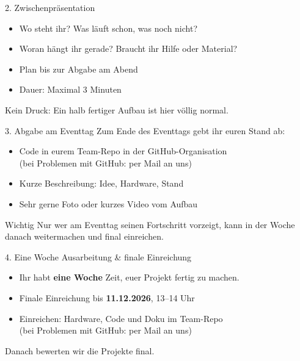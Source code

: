 \documentclass[10pt]{beamer}
\begin{document}
\begin{frame}{2. Zwischenpräsentation}
  \begin{itemize}
    \item Wo steht ihr? Was läuft schon, was noch nicht?
    \item Woran hängt ihr gerade? Braucht ihr Hilfe oder Material?
    \item Plan bis zur Abgabe am Abend
    \item Dauer: Maximal 3 Minuten
  \end{itemize}
  \vspace{0.5em}
  Kein Druck: Ein halb fertiger Aufbau ist hier völlig normal.
\end{frame}

\begin{frame}{3. Abgabe am Eventtag}
  Zum Ende des Eventtags gebt ihr euren Stand ab:
  \begin{itemize}
    \item Code in eurem Team-Repo in der GitHub-Organisation\\
          {\small(bei Problemen mit GitHub: per Mail an uns)}
    \item Kurze Beschreibung: Idee, Hardware, Stand
    \item Sehr gerne Foto oder kurzes Video vom Aufbau
  \end{itemize}
  \vspace{0.5em}
  \begin{alertblock}{Wichtig}
    Nur wer am Eventtag seinen Fortschritt vorzeigt, kann in der Woche danach weitermachen und final einreichen.
  \end{alertblock}
\end{frame}

\begin{frame}{4. Eine Woche Ausarbeitung \& finale Einreichung}
  \begin{itemize}
    \item Ihr habt \textbf{eine Woche} Zeit, euer Projekt fertig zu machen.
    \item Finale Einreichung bis \textbf{11.12.2026}, 13--14 Uhr
    \item Einreichen: Hardware, Code und Doku im Team-Repo\\
          {\small(bei Problemen mit GitHub: per Mail an uns)}
  \end{itemize}
  \vspace{0.5em}
  Danach bewerten wir die Projekte final.
\end{frame}
\end{document}
